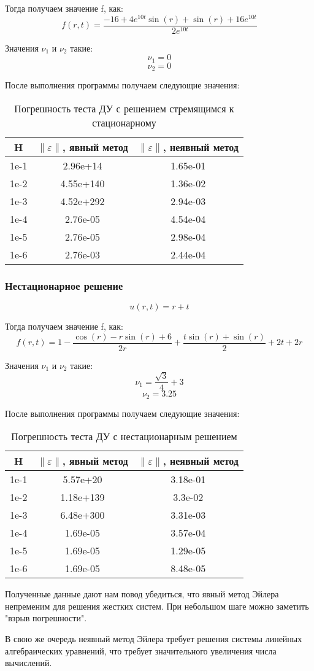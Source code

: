 Тогда получаем значение f, как:
\[
  f(r, t) = \frac{-16 + 4e^{10t}\sin(r) + \sin(r) + 16e^{10t}}{2e^{10t}}
\]

Значения $ \nu_1 $ и $ \nu_2 $ такие:
\[
  \nu_1 = 0
\]
\[
  \nu_2 = 0
\]

После выполнения программы получаем следующие значения:
\begin{table}[H]
  \centering
  \begin{tabular}{c | c | c}
    \toprule
    H & $ \left\lVert \varepsilon \right\rVert  $, явный метод & $ \left\lVert \varepsilon \right\rVert  $, неявный метод \\
    \midrule
    1e-1 & 2.96e+14 & 1.65e-01\\
    1e-2 & 4.55e+140 & 1.36e-02\\
    1e-3 & 4.52e+292 & 2.94e-03\\
    1e-4 & 2.76e-05 & 4.54e-04\\
    1e-5 & 2.76e-05 & 2.98e-04\\
    1e-6 & 2.76e-03 & 2.44e-04\\
    \bottomrule
  \end{tabular}
  \caption{Погрешность теста ДУ с решением стремящимся к стационарному}
\end{table}

\subsubsection{Нестационарное решение}
\[
  u(r, t) = r + t
\]

Тогда получаем значение f, как:
\[
  f(r, t) = 1 - \frac{\cos(r) - r\sin(r) + 6}{2r} + \frac{t\sin(r)+\sin(r)}{2} + 2t + 2r
\]

Значения $ \nu_1 $ и $ \nu_2 $ такие:
\[
  \nu_1 = \frac{\sqrt{3}}{4} + 3
\]
\[
  \nu_2 = 3.25
\]

После выполнения программы получаем следующие значения:
\begin{table}[H]
  \centering
  \begin{tabular}{c | c | c}
    \toprule
    H & $ \left\lVert \varepsilon \right\rVert  $, явный метод & $ \left\lVert \varepsilon \right\rVert  $, неявный метод \\
    \midrule
    1e-1 & 5.57e+20 & 3.18e-01\\
    1e-2 & 1.18e+139 & 3.3e-02\\
    1e-3 & 6.48e+300 & 3.31e-03\\
    1e-4 & 1.69e-05 & 3.57e-04\\
    1e-5 & 1.69e-05 & 1.29e-05\\
    1e-6 & 1.69e-05 & 8.48e-05\\
    \bottomrule
  \end{tabular}
  \caption{Погрешность теста ДУ с нестационарным решением}
\end{table}

Полученные данные дают нам повод убедиться, что явный метод Эйлера непременим для решения жестких систем.
При небольшом шаге можно заметить "взрыв погрешности". 

В свою же очередь неявный метод Эйлера требует решения системы линейных алгебраических уравнений, что требует
значительного увеличения числа вычислений.